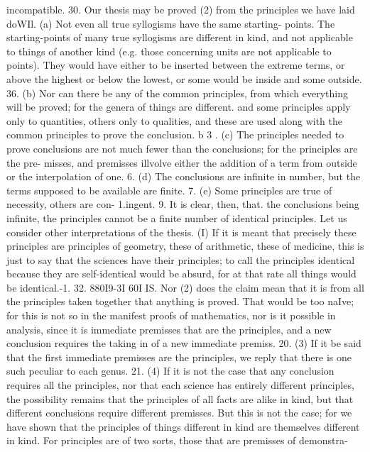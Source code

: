 {{{{{{{{{{{{{{{{{{{{{{{{{{{{{{{{{{{{{{incompatible.
30. Our thesis may be proved (2) from the principles we have
laid doWIl. (a) Not even all true syllogisms have the same starting-
points. The starting-points of many true syllogisms are different
in kind, and not applicable to things of another kind (e.g. those
concerning units are not applicable to points). They would have
either to be inserted between the extreme terms, or above the
highest or below the lowest, or some would be inside and some
outside.
36. (b) Nor can there be any of the common principles, from
which everything will be proved; for the genera of things are
different. and some principles apply only to quantities, others
only to qualities, and these are used along with the common
principles to prove the conclusion.
b 3 . (c) The principles needed to prove conclusions are not
much fewer than the conclusions; for the principles are the pre-
misses, and premisses illvolve either the addition of a term from
outside or the interpolation of one.
6. (d) The conclusions are infinite in number, but the terms
supposed to be available are finite.
7. (e) Some principles are true of necessity, others are con-
1.ingent.
9. It is clear, then, that. the conclusions being infinite, the
principles cannot be a finite number of identical principles. Let
us consider other interpretations of the thesis. (I) If it is meant
that precisely these principles are principles of geometry, these
of arithmetic, these of medicine, this is just to say that the sciences
have their principles; to call the principles identical because
they are self-identical would be absurd, for at that rate all things
would be identical.-1. 32. 880I9-3I
60I
IS. Nor (2) does the claim mean that it is from all the principles
taken together that anything is proved. That would be too naIve;
for this is not so in the manifest proofs of mathematics, nor is it
possible in analysis, since it is immediate premisses that are the
principles, and a new conclusion requires the taking in of a new
immediate premiss.
20. (3) If it be said that the first immediate premisses are
the principles, we reply that there is one such peculiar to each
genus.
21. (4) If it is not the case that any conclusion requires all the
principles, nor that each science has entirely different principles,
the possibility remains that the principles of all facts are alike
in kind, but that different conclusions require different premisses.
But this is not the case; for we have shown that the principles
of things different in kind are themselves different in kind. For
principles are of two sorts, those that are premisses of demonstra-
}}}}}}}}}}}}}}}}}}}}}}}}}}}}}}}}}}}}}}
